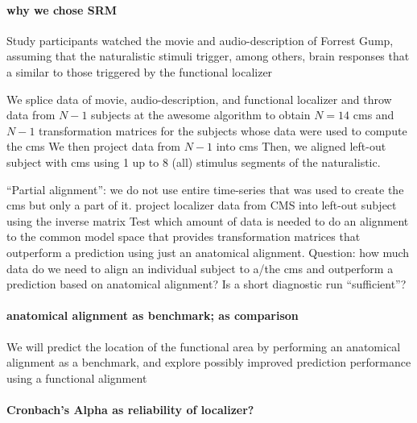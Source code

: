 \paragraph{why we chose SRM}




Study participants watched the movie and audio-description of Forrest Gump,
assuming that the naturalistic stimuli trigger, among others, brain responses
that a similar to those triggered by the functional localizer

We splice data of movie, audio-description, and functional localizer and throw
data from $N-1$ subjects at the awesome algorithm to obtain $N=14$ \ac{cms} and
$N-1$ transformation matrices for the subjects whose data were used to compute
the \ac{cms}
%
We then project data from $N-1$ into \ac{cms}
%
Then, we aligned left-out subject with \ac{cms} using 1 up to 8 (all) stimulus
segments of the naturalistic.
%

%
``Partial alignment'': we do not use entire time-series that was used to create
the \ac{cms} but only a part of it.
%
project localizer data from CMS into left-out subject using the inverse matrix
%
Test which amount of data is needed to do an alignment to the common model space
that provides transformation matrices that outperform a prediction using just an
anatomical alignment.
%
Question: how much data do we need to align an individual subject to a/the
\ac{cms} and outperform a prediction based on anatomical alignment?
%
Is a short diagnostic run ``sufficient''?
%

\paragraph{anatomical alignment as benchmark; as comparison}

We will predict the location of the functional area by performing an
anatomical alignment as a benchmark, and explore possibly improved prediction
performance using a functional alignment

\paragraph{Cronbach's Alpha as reliability of localizer?}


